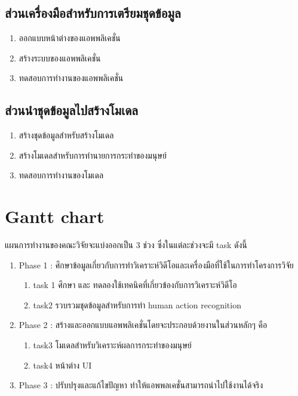 \subsection*{ส่วนเครื่องมือสำหรับการเตรียมชุดข้อมูล}
\begin{enumerate}\setlength\itemsep{-0.25em}
	\item ออกแบบหน้าต่างของแอพพลิเคชั่น
	\item สร้างระบบของแอพพลิเคชั่น
	\item ทดสอบการทำงานของแอพพลิเคชั่น
\end{enumerate}
\subsection*{ส่วนนำชุดข้อมูลไปสร้างโมเดล}
\begin{enumerate}\setlength\itemsep{-0.25em}
	\item สร้างชุดข้อมูลสำหรับสร้างโมเดล
	\item สร้างโมเดลสำหรับการทำนายการกระทำของมนุษย์
	\item ทดสอบการทำงานของโมเดล
\end{enumerate}
\clearpage
\section{Gantt chart}แผนการทำงานของคณะวิจัยจะแบ่งออกเป็น 3 ช่วง ซึ่งในแต่ละช่วงจะมี task ดังนี้
\begin{enumerate}
	\item Phase 1 :  ศึกษาข้อมูลเกี่ยวกับการทำวิเคราะห์วิดีโอและเครื่องมือที่ใช้ในการทำโครงการวิจัย
		\begin{enumerate}\setlength\itemsep{-0.25em}
			\item task 1 	ศึกษา และ ทดลองใช้เทคนิคที่เกี่ยวข้องกับการวิเคราะห์วิดีโอ
			\item task2	รวบรวมชุดข้อมูลสำหรับการทำ human action recognition
		\end{enumerate}
	\item Phase 2 :  สร้างและออกแบบแอพพลิเคชั่นโดยจะประกอบด้วยงานในส่วนหลักๆ คือ
		\begin{enumerate}\setlength\itemsep{-0.25em}
			\item task3	โมเดลสำหรับวิเคราะห์ผลการกระทำของมนุษย์
			\item task4	หน้าต่าง UI
		\end{enumerate}
	\item Phase 3 : ปรับปรุงและแก้ไขปัญหา ทำให้แอพพลเคชั่นสามารถนำไปใช้งานได้จริง
\end{enumerate}

